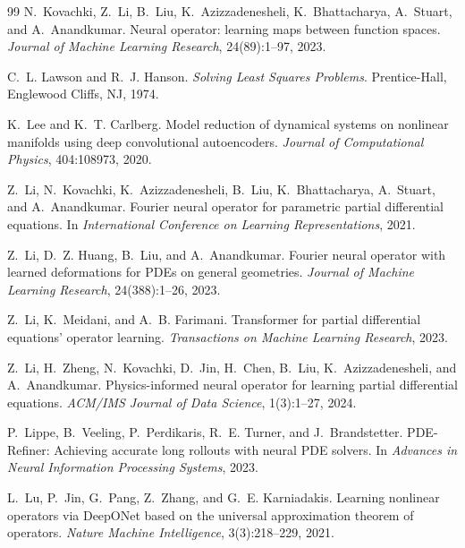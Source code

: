 \begin{thebibliography}{99}
N.~Kovachki, Z.~Li, B.~Liu, K.~Azizzadenesheli, K.~Bhattacharya,
A.~Stuart, and A.~Anandkumar.
\newblock Neural operator: learning maps between function spaces.
\newblock \emph{Journal of Machine Learning Research}, 24(89):1--97,
2023.

C.~L. Lawson and R.~J. Hanson.
\newblock \emph{Solving Least Squares Problems}.
\newblock Prentice-Hall, Englewood Cliffs, NJ, 1974.

K.~Lee and K.~T. Carlberg.
\newblock Model reduction of dynamical systems on nonlinear manifolds
using deep convolutional autoencoders.
\newblock \emph{Journal of Computational Physics}, 404:108973, 2020.

Z.~Li, N.~Kovachki, K.~Azizzadenesheli, B.~Liu, K.~Bhattacharya,
A.~Stuart, and A.~Anandkumar.
\newblock Fourier neural operator for parametric partial differential
equations.
\newblock In \emph{International Conference on Learning Representations},
2021.

Z.~Li, D.~Z. Huang, B.~Liu, and A.~Anandkumar.
\newblock Fourier neural operator with learned deformations for PDEs
on general geometries.
\newblock \emph{Journal of Machine Learning Research}, 24(388):1--26,
2023.

Z.~Li, K.~Meidani, and A.~B. Farimani.
\newblock Transformer for partial differential equations' operator
learning.
\newblock \emph{Transactions on Machine Learning Research}, 2023.

Z.~Li, H.~Zheng, N.~Kovachki, D.~Jin, H.~Chen, B.~Liu,
K.~Azizzadenesheli, and A.~Anandkumar.
\newblock Physics-informed neural operator for learning partial
differential equations.
\newblock \emph{ACM/IMS Journal of Data Science}, 1(3):1--27, 2024.

P.~Lippe, B.~Veeling, P.~Perdikaris, R.~E. Turner, and J.~Brandstetter.
\newblock PDE-Refiner: Achieving accurate long rollouts with neural
PDE solvers.
\newblock In \emph{Advances in Neural Information Processing Systems},
2023.

L.~Lu, P.~Jin, G.~Pang, Z.~Zhang, and G.~E. Karniadakis.
\newblock Learning nonlinear operators via DeepONet based on the
universal approximation theorem of operators.
\newblock \emph{Nature Machine Intelligence}, 3(3):218--229, 2021.


\end{thebibliography}
